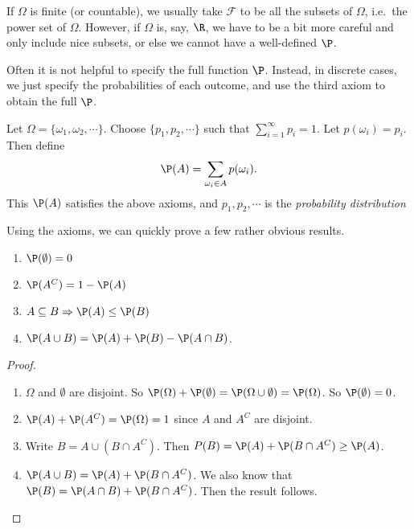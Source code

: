\documentclass[a4paper]{article}
\begin{document}
If $\Omega$ is finite (or countable), we usually take $\mathcal{F}$ to be all the subsets of $\Omega$, i.e.\ the power set of $\Omega$. However, if $\Omega$ is, say, $\R$, we have to be a bit more careful and only include nice subsets, or else we cannot have a well-defined $\P$.

Often it is not helpful to specify the full function $\P$. Instead, in discrete cases, we just specify the probabilities of each outcome, and use the third axiom to obtain the full $\P$.

\begin{defi}
  Let $\Omega = \{\omega_1, \omega_2, \cdots\}$. Choose $\{p_1, p_2, \cdots \}$ such that $\sum_{i = 1}^\infty p_i= 1$. Let $p(\omega_i) = p_i$. Then define
  \[
    \P(A) = \sum_{\omega_i\in A} p(\omega_i).
  \]
  This $\P(A)$ satisfies the above axioms, and $p_1, p_2, \cdots$ is the \emph{probability distribution}
\end{defi}

Using the axioms, we can quickly prove a few rather obvious results.
\begin{thm}\leavevmode
  \begin{enumerate}
    \item $\P(\emptyset) = 0$
    \item $\P(A^C) = 1 - \P(A)$
    \item $A\subseteq B \Rightarrow \P(A) \leq \P(B)$
    \item $\P (A\cup B) = \P(A) + \P(B) - \P(A\cap B)$.
  \end{enumerate}
\end{thm}

\begin{proof}\leavevmode
  \begin{enumerate}
    \item $\Omega$ and $\emptyset$ are disjoint. So $\P(\Omega) + \P(\emptyset) = \P(\Omega \cup \emptyset) = \P(\Omega)$. So $\P(\emptyset) = 0$.
    \item $\P(A) + \P(A^C) = \P(\Omega) = 1$ since $A$ and $A^C$ are disjoint.
    \item Write $B = A\cup (B\cap A^C)$. Then $\\P(B) = \P(A) + \P(B\cap A^C) \geq \P(A)$.
    \item $\P(A\cup B) = \P(A) + \P(B\cap A^C)$. We also know that $\P(B) = \P(A\cap B) + \P(B\cap A^C)$. Then the result follows.
  \end{enumerate}
\end{proof}
\end{document}
